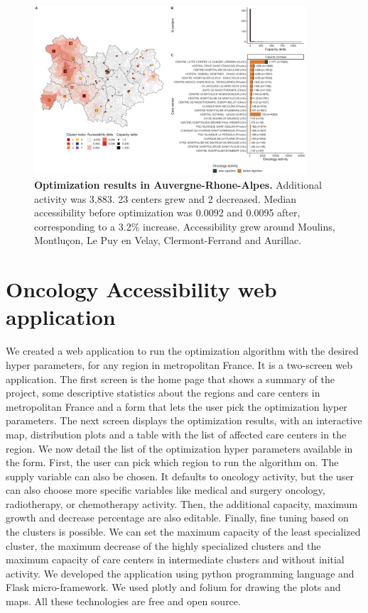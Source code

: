 \begin{figure}[H]
    \includegraphics[width=0.9\textwidth]{images/camion/optim_region/optim_Auvergne-Rhone-Alpes.png}
    \centering
    \caption{ \textbf{Optimization results in Auvergne-Rhone-Alpes.} Additional
        activity was 3,883. 23 centers grew and 2 decreased. Median
        accessibility before optimization was 0.0092 and 0.0095 after,
        corresponding to a 3.2\% increase. Accessibility grew around Moulins,
        Montluçon, Le Puy en Velay, Clermont-Ferrand and Aurillac. }
\end{figure}

\section{Oncology Accessibility web application}

We created a web application to run the optimization algorithm with the desired
hyper parameters, for any region in metropolitan France. It is a two-screen web
application. The first screen is the home page that shows a summary of the
project, some descriptive statistics about the regions and care centers in
metropolitan France and a form that lets the user pick the optimization hyper
parameters. The next screen displays the optimization results, with an
interactive map, distribution plots and a table with the list of affected care
centers in the region. We now detail the list of the optimization hyper
parameters available in the form. First, the user can pick which region to run
the algorithm on. The supply variable can also be chosen. It defaults to
oncology activity, but the user can also choose more specific variables like
medical and surgery oncology, radiotherapy, or chemotherapy activity. Then, the
additional capacity, maximum growth and decrease percentage are also editable.
Finally, fine tuning based on the clusters is possible. We can set the maximum
capacity of the least specialized cluster, the maximum decrease of the highly
specialized clusters and the maximum capacity of care centers in intermediate
clusters and without initial activity. We developed the application using python
programming language and Flask micro-framework. We used plotly and folium for
drawing the plots and maps. All these technologies are free and open source.

